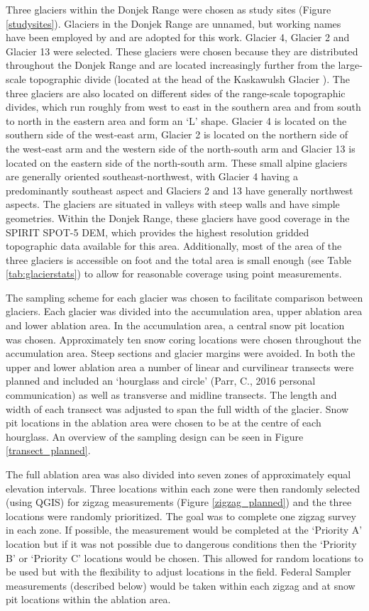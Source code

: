 \documentclass{sfuthesis}
\begin{document}
Three glaciers within the Donjek Range were chosen as study sites (Figure \ref{studysites}). Glaciers in the Donjek Range are unnamed, but working names have been employed by \cite{Crompton2016} and are adopted for this work. Glacier 4, Glacier 2 and Glacier 13 were selected. These glaciers were chosen because they are distributed throughout the Donjek Range and are located increasingly further from the large-scale topographic divide (located at the head of the Kaskawulsh Glacier \citep{Taylor1969}). The three glaciers are also located on different sides of the range-scale topographic divides, which run roughly from west to east in the southern area and from south to north in the eastern area and form an `L' shape. Glacier 4 is located on the southern side of the west-east arm, Glacier 2 is located on the northern side of the west-east arm and the western side of the north-south arm and Glacier 13 is located on the eastern side of the north-south arm. These small alpine glaciers are generally oriented southeast-northwest, with Glacier 4 having a predominantly southeast aspect and Glaciers 2 and 13 have generally northwest aspects. The glaciers are situated in valleys with steep walls and have simple geometries. Within the Donjek Range, these glaciers have good coverage in the SPIRIT SPOT-5 DEM, which provides the highest resolution gridded topographic data available for this area. Additionally, most of the area of the three glaciers is accessible on foot and the total area is small enough (see Table \ref{tab:glacierstats}) to allow for reasonable coverage using point measurements.

The sampling scheme for each glacier was chosen to facilitate comparison between glaciers. Each glacier was divided into the accumulation area, upper ablation area and lower ablation area. In the accumulation area, a central snow pit location was chosen. Approximately ten snow coring locations were chosen throughout the accumulation area. Steep sections and glacier margins were avoided. In both the upper and lower ablation area a number of linear and curvilinear transects were planned and included an `hourglass and circle' (Parr, C., 2016 personal communication) as well as transverse and midline transects. The length and width of each transect was adjusted to span the full width of the glacier. Snow pit locations in the ablation area were chosen to be at the centre of each hourglass. An overview of the sampling design can be seen in Figure \ref{transect_planned}.

The full ablation area was also divided into seven zones of approximately equal elevation intervals. Three locations within each zone were then randomly selected (using QGIS) for zigzag \citep{Shea2010} measurements (Figure \ref{zigzag_planned}) and the three locations were randomly prioritized. The goal was to complete one zigzag survey in each zone. If possible, the measurement would be completed at the `Priority A' location but if it was not possible due to dangerous conditions then the `Priority B' or `Priority C' locations would be chosen. This allowed for random locations to be used but with the flexibility to adjust locations in the field. Federal Sampler measurements (described below) would be taken within each zigzag and at snow pit locations within the ablation area.  
\end{document}
